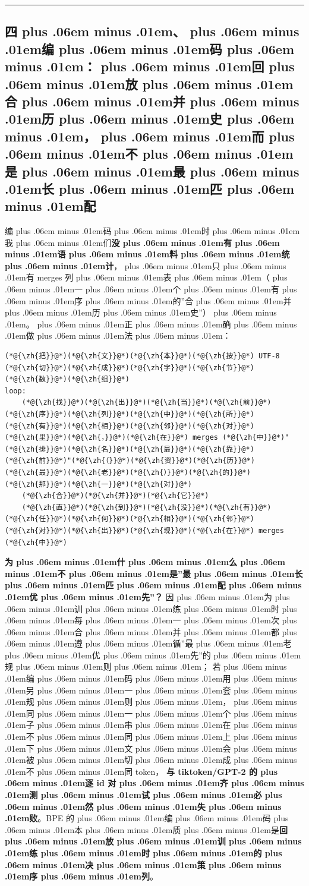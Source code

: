 \documentclass[
]{article}
\def\zh#1{{\zhfont #1}}
\def\zhglue{\hskip0pt plus .06em minus .01em}
\begin{document}
\begin{center}\rule{0.5\linewidth}{0.5pt}\end{center}

\subsection{\zh{四\zhglue 、\zhglue 编\zhglue 码\zhglue ：\zhglue 回\zhglue 放\zhglue 合\zhglue 并\zhglue 历\zhglue 史\zhglue ，\zhglue 而\zhglue 不\zhglue 是\zhglue 最\zhglue 长\zhglue 匹\zhglue 配}}\label{ux56dbux7f16ux7801ux56deux653eux5408ux5e76ux5386ux53f2ux800cux4e0dux662fux6700ux957fux5339ux914d}

\zh{编\zhglue 码\zhglue 时\zhglue 我\zhglue 们}\textbf{\zh{没\zhglue 有\zhglue 语\zhglue 料\zhglue 统\zhglue 计}}\zh{，\zhglue 只\zhglue 有} merges \zh{列\zhglue 表\zhglue （\zhglue 一\zhglue 个\zhglue 有\zhglue 序\zhglue 的}''\zh{合\zhglue 并\zhglue 历\zhglue 史}''\zh{）\zhglue 。\zhglue 正\zhglue 确\zhglue 做\zhglue 法\zhglue ：}

\begin{lstlisting}
(*@{\zh{把}}@*)(*@{\zh{文}}@*)(*@{\zh{本}}@*)(*@{\zh{按}}@*) UTF-8 (*@{\zh{切}}@*)(*@{\zh{成}}@*)(*@{\zh{字}}@*)(*@{\zh{节}}@*)(*@{\zh{数}}@*)(*@{\zh{组}}@*)
loop:
    (*@{\zh{找}}@*)(*@{\zh{出}}@*)(*@{\zh{当}}@*)(*@{\zh{前}}@*)(*@{\zh{序}}@*)(*@{\zh{列}}@*)(*@{\zh{中}}@*)(*@{\zh{所}}@*)(*@{\zh{有}}@*)(*@{\zh{相}}@*)(*@{\zh{邻}}@*)(*@{\zh{对}}@*)(*@{\zh{里}}@*)(*@{\zh{，}}@*)(*@{\zh{在}}@*) merges (*@{\zh{中}}@*)"(*@{\zh{排}}@*)(*@{\zh{名}}@*)(*@{\zh{最}}@*)(*@{\zh{靠}}@*)(*@{\zh{前}}@*)"(*@{\zh{（}}@*)(*@{\zh{资}}@*)(*@{\zh{历}}@*)(*@{\zh{最}}@*)(*@{\zh{老}}@*)(*@{\zh{）}}@*)(*@{\zh{的}}@*)(*@{\zh{那}}@*)(*@{\zh{一}}@*)(*@{\zh{对}}@*)
    (*@{\zh{合}}@*)(*@{\zh{并}}@*)(*@{\zh{它}}@*)
    (*@{\zh{直}}@*)(*@{\zh{到}}@*)(*@{\zh{没}}@*)(*@{\zh{有}}@*)(*@{\zh{任}}@*)(*@{\zh{何}}@*)(*@{\zh{相}}@*)(*@{\zh{邻}}@*)(*@{\zh{对}}@*)(*@{\zh{出}}@*)(*@{\zh{现}}@*)(*@{\zh{在}}@*) merges (*@{\zh{中}}@*)
\end{lstlisting}

\textbf{\zh{为\zhglue 什\zhglue 么\zhglue 不\zhglue 是}''\zh{最\zhglue 长\zhglue 匹\zhglue 配\zhglue 优\zhglue 先}''\zh{？}} \zh{因\zhglue 为\zhglue 训\zhglue 练\zhglue 时\zhglue 每\zhglue 一\zhglue 次\zhglue 合\zhglue 并\zhglue 都\zhglue 遵\zhglue 循}''\zh{最\zhglue 老\zhglue 优\zhglue 先}''\zh{的\zhglue 规\zhglue 则\zhglue ；} \zh{若\zhglue 编\zhglue 码\zhglue 用\zhglue 另\zhglue 一\zhglue 套\zhglue 规\zhglue 则\zhglue ，\zhglue 同\zhglue 一\zhglue 个\zhglue 子\zhglue 串\zhglue 在\zhglue 不\zhglue 同\zhglue 上\zhglue 下\zhglue 文\zhglue 会\zhglue 被\zhglue 切\zhglue 成\zhglue 不\zhglue 同} token\zh{，} \textbf{\zh{与} tiktoken/GPT-2 \zh{的\zhglue 逐} id \zh{对\zhglue 齐\zhglue 测\zhglue 试\zhglue 必\zhglue 然\zhglue 失\zhglue 败}}\zh{。}BPE \zh{的\zhglue 编\zhglue 码\zhglue 本\zhglue 质\zhglue 是}\textbf{\zh{回\zhglue 放\zhglue 训\zhglue 练\zhglue 时\zhglue 的\zhglue 决\zhglue 策\zhglue 序\zhglue 列}}\zh{。}
\end{document}
